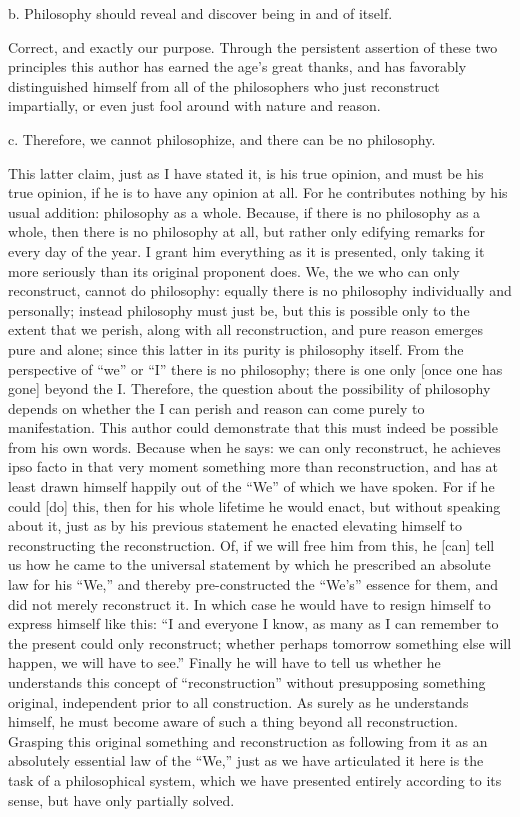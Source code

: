 b. Philosophy should reveal and discover being in and of itself.

Correct, and exactly our purpose.
Through the persistent assertion of these two principles
this author has earned the age's great thanks,
and has favorably distinguished himself from
all of the philosophers who just reconstruct impartially,
or even just fool around with nature and reason.

c. Therefore, we cannot philosophize, and there can be no philosophy.

This latter claim, just as I have stated it,
is his true opinion, and must be his true opinion,
if he is to have any opinion at all.
For he contributes nothing by his usual addition:
philosophy as a whole.
Because, if there is no philosophy as a whole,
then there is no philosophy at all,
but rather only edifying remarks for every day of the year.
I grant him everything as it is presented,
only taking it more seriously than its original proponent does.
We, the we who can only reconstruct, cannot do philosophy:
equally there is no philosophy individually and personally;
instead philosophy must just be,
but this is possible only to the extent
that we perish, along with all reconstruction,
and pure reason emerges pure and alone;
since this latter in its purity is philosophy itself.
From the perspective of “we” or “I”
there is no philosophy;
there is one only [once one has gone] beyond the I.
Therefore, the question about the possibility of philosophy
depends on whether the I can perish
and reason can come purely to manifestation.
This author could demonstrate that
this must indeed be possible from his own words.
Because when he says:
we can only reconstruct, he achieves ipso facto
in that very moment something more than reconstruction,
and has at least drawn himself happily out
of the “We” of which we have spoken.
For if he could [do] this,
then for his whole lifetime he would enact,
but without speaking about it,
just as by his previous statement
he enacted elevating himself to
reconstructing the reconstruction.
Of, if we will free him from this,
he [can] tell us how he came to the universal statement
by which he prescribed an absolute law for his “We,”
and thereby pre-constructed the “We's” essence for them,
and did not merely reconstruct it.
In which case he would have to resign himself
to express himself like this:
“I and everyone I know,
as many as I can remember to the present
could only reconstruct;
whether perhaps tomorrow something else will happen,
we will have to see.”
Finally he will have to tell us whether
he understands this concept of “reconstruction”
without presupposing something original,
independent prior to all construction.
As surely as he understands himself,
he must become aware of such
a thing beyond all reconstruction.
Grasping this original something and reconstruction
as following from it as an absolutely essential law of the “We,”
just as we have articulated it here is
the task of a philosophical system,
which we have presented entirely
according to its sense,
but have only partially solved.

